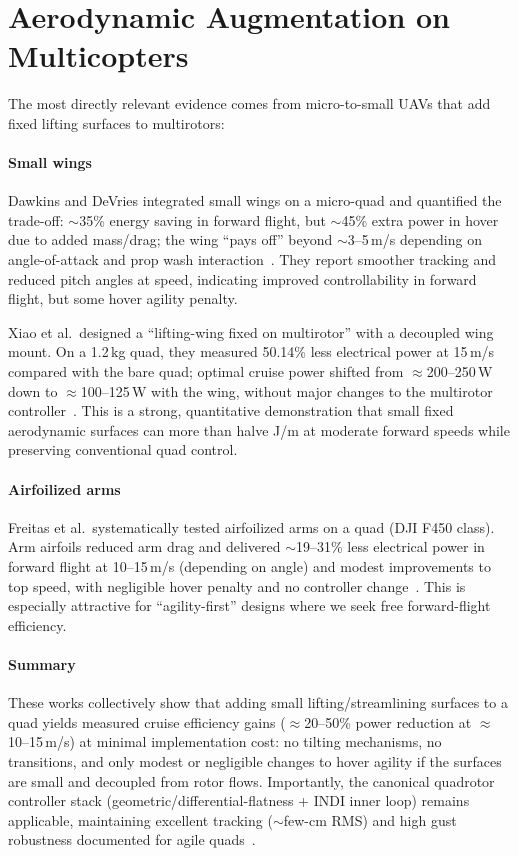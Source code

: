 \section{Aerodynamic Augmentation on Multicopters}

The most directly relevant evidence comes from micro-to-small UAVs that add fixed lifting surfaces to multirotors:

\paragraph{Small wings}
Dawkins and DeVries integrated small wings on a micro-quad and quantified the trade-off: $\sim$35\% energy saving in forward flight, but $\sim$45\% extra power in hover due to added mass/drag; the wing ``pays off'' beyond $\sim$3--5\,m/s depending on angle-of-attack and prop wash interaction~\cite{Dawkins2018}.
They report smoother tracking and reduced pitch angles at speed, indicating improved controllability in forward flight, but some hover agility penalty.

Xiao et al.\ designed a ``lifting-wing fixed on multirotor'' with a decoupled wing mount.
On a 1.2\,kg quad, they measured 50.14\% less electrical power at 15\,m/s compared with the bare quad; optimal cruise power shifted from $\approx$200--250\,W down to $\approx$100--125\,W with the wing, without major changes to the multirotor controller~\cite{Xiao2020}.
This is a strong, quantitative demonstration that small fixed aerodynamic surfaces can more than halve J/m at moderate forward speeds while preserving conventional quad control.

\paragraph{Airfoilized arms}
Freitas et al.\ systematically tested airfoilized arms on a quad (DJI F450 class).
Arm airfoils reduced arm drag and delivered $\sim$19--31\% less electrical power in forward flight at 10--15\,m/s (depending on angle) and modest improvements to top speed, with negligible hover penalty and no controller change~\cite{Freitas2025}.
This is especially attractive for ``agility-first'' designs where we seek free forward-flight efficiency.

\paragraph{Summary}
These works collectively show that adding small lifting/streamlining surfaces to a quad yields measured cruise efficiency gains ($\approx$20--50\% power reduction at $\approx$10--15\,m/s) at minimal implementation cost: no tilting mechanisms, no transitions, and only modest or negligible changes to hover agility if the surfaces are small and decoupled from rotor flows.
Importantly, the canonical quadrotor controller stack (geometric/differential-flatness + INDI inner loop) remains applicable, maintaining excellent tracking ($\sim$few-cm RMS) and high gust robustness documented for agile quads~\cite{Tal2018,Foehn2022,Sun2021}.


